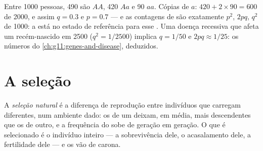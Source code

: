 \begin{example}\label{ex:g12:selection-drift-speciation:count}
Entre 1000 pessoas, 490 são $AA$, 420 $Aa$ e 90 $aa$. Cópias de $a$:
$420 + 2 \times 90 = 600$ de 2000, e assim $q = 0.3$ e $p = 0.7$ ---
e as contagens de  são exatamente $p^2$, $2pq$, $q^2$ de 1000:
a  está no estado de referência para esse . Uma doença
recessiva que afeta um recém-nascido em 2500 ($q^2 = 1/2500$) implica
$q = 1/50$ e  $2pq \approx 1/25$: os números do
\cref{ch:g11:genes-and-disease}, deduzidos.
\end{example}

\section{A seleção}

\begin{definition}\label{def:g12:selection-drift-speciation:selection}
A \emph{seleção natural} é a diferença de
reprodução entre indivíduos que carregam  diferentes, num
ambiente dado: os  de um  deixam, em média, mais
descendentes que os  de outro, e a frequência do  sobe
de geração em geração. O que é selecionado é o indivíduo inteiro --- a
sobrevivência dele, o acasalamento dele, a fertilidade dele --- e os
 vão de carona.
\end{definition}

